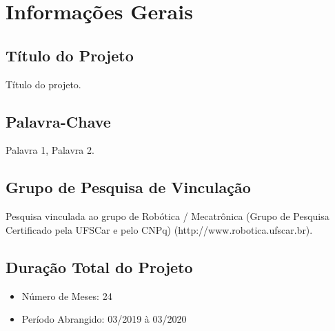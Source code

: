 \documentclass[projeto]{ufscar}
\begin{document}
\pretextual

\maketitle

\sumario

\mainmatter

\chapter{Informações Gerais}

\section{Título do Projeto}

Título do projeto.


\section{Palavra-Chave}

Palavra 1, Palavra 2.


\section{Grupo de Pesquisa de Vinculação}

Pesquisa vinculada ao grupo de Robótica / Mecatrônica (Grupo de Pesquisa Certificado pela UFSCar e pelo CNPq) (http://www.robotica.ufscar.br).

\section{Duração Total do Projeto}
\begin{itemize}
    \item Número de Meses: 24
    \item Período Abrangido: 03/2019 à 03/2020
\end{itemize}
\end{document}
